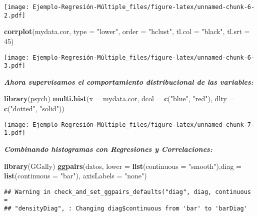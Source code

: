 \documentclass[]{article}
\newenvironment{Shaded}{\begin{snugshade}}{\end{snugshade}}
\newcommand{\KeywordTok}[1]{\textcolor[rgb]{0.13,0.29,0.53}{\textbf{#1}}}
\newcommand{\DataTypeTok}[1]{\textcolor[rgb]{0.13,0.29,0.53}{#1}}
\newcommand{\DecValTok}[1]{\textcolor[rgb]{0.00,0.00,0.81}{#1}}
\newcommand{\StringTok}[1]{\textcolor[rgb]{0.31,0.60,0.02}{#1}}
\newcommand{\NormalTok}[1]{#1}
\begin{document}
\texttt{[image: Ejemplo-Regresión-Múltiple\_files/figure-latex/unnamed-chunk-6-2.pdf]}

\begin{Shaded}
\begin{Highlighting}[]
\KeywordTok{corrplot}\NormalTok{(mydata.cor, }\DataTypeTok{type =} \StringTok{"lower"}\NormalTok{, }\DataTypeTok{order =} \StringTok{"hclust"}\NormalTok{, }\DataTypeTok{tl.col =} \StringTok{"black"}\NormalTok{, }\DataTypeTok{tl.srt =} \DecValTok{45}\NormalTok{)}
\end{Highlighting}
\end{Shaded}

\texttt{[image: Ejemplo-Regresión-Múltiple\_files/figure-latex/unnamed-chunk-6-3.pdf]}

\emph{\textbf{Ahora supervisamos el comportamiento distribucional de las
variables:}}

\begin{Shaded}
\begin{Highlighting}[]
\KeywordTok{library}\NormalTok{(psych)}
\KeywordTok{multi.hist}\NormalTok{(}\DataTypeTok{x =}\NormalTok{ mydata.cor, }\DataTypeTok{dcol =} \KeywordTok{c}\NormalTok{(}\StringTok{"blue"}\NormalTok{, }\StringTok{"red"}\NormalTok{), }\DataTypeTok{dlty =} \KeywordTok{c}\NormalTok{(}\StringTok{"dotted"}\NormalTok{, }\StringTok{"solid"}\NormalTok{))}
\end{Highlighting}
\end{Shaded}

\texttt{[image: Ejemplo-Regresión-Múltiple\_files/figure-latex/unnamed-chunk-7-1.pdf]}

\emph{\textbf{Combinando histogramas con Regresiones y Correlaciones:}}

\begin{Shaded}
\begin{Highlighting}[]
\KeywordTok{library}\NormalTok{(GGally)}
\KeywordTok{ggpairs}\NormalTok{(datos, }\DataTypeTok{lower =} \KeywordTok{list}\NormalTok{(}\DataTypeTok{continuous =} \StringTok{"smooth"}\NormalTok{),}\DataTypeTok{diag =} \KeywordTok{list}\NormalTok{(}\DataTypeTok{continuous =} \StringTok{"bar"}\NormalTok{), }\DataTypeTok{axisLabels =} \StringTok{"none"}\NormalTok{)}
\end{Highlighting}
\end{Shaded}

\begin{verbatim}
## Warning in check_and_set_ggpairs_defaults("diag", diag, continuous =
## "densityDiag", : Changing diag$continuous from 'bar' to 'barDiag'
\end{verbatim}
\end{document}
